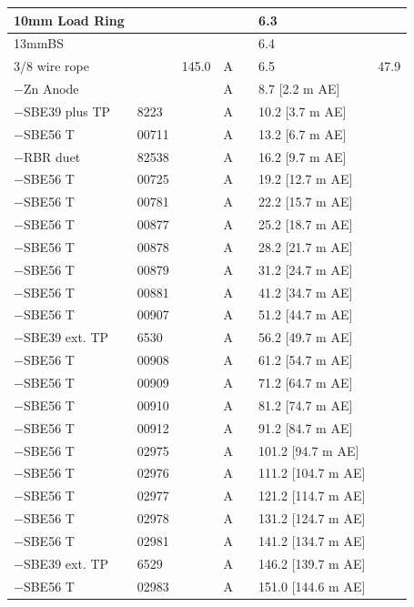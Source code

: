 \documentclass{article}
\begin{document}
\begin{tabularx}{\linewidth}{|X|X|l|l|l|X|l|}
10mm Load Ring &  &  &  &  & 6.3 &  \\ \hline
13mmBS &  &  &  &  & 6.4 &  \\ \hline
3/8 wire rope &  & 145.0 & A &  & 6.5 & 47.9 \\ \hline
$-$Zn Anode &  &  & A &  & 8.7 [2.2 m AE] &  \\ \hline
$-$SBE39 plus TP & 8223 &  & A &  & 10.2 [3.7 m AE] &  \\ \hline
$-$SBE56 T & 00711 &  & A &  & 13.2 [6.7 m AE] &  \\ \hline
$-$RBR duet & 82538 &  & A &  & 16.2 [9.7 m AE] &  \\ \hline
$-$SBE56 T & 00725 &  & A &  & 19.2 [12.7 m AE] &  \\ \hline
$-$SBE56 T & 00781 &  & A &  & 22.2 [15.7 m AE] &  \\ \hline
$-$SBE56 T & 00877 &  & A &  & 25.2 [18.7 m AE] &  \\ \hline
$-$SBE56 T & 00878 &  & A &  & 28.2 [21.7 m AE] &  \\ \hline
$-$SBE56 T & 00879 &  & A &  & 31.2 [24.7 m AE] &  \\ \hline
$-$SBE56 T & 00881 &  & A &  & 41.2 [34.7 m AE] &  \\ \hline
$-$SBE56 T & 00907 &  & A &  & 51.2 [44.7 m AE] &  \\ \hline
$-$SBE39 ext. TP & 6530 &  & A &  & 56.2 [49.7 m AE] &  \\ \hline
$-$SBE56 T & 00908 &  & A &  & 61.2 [54.7 m AE] &  \\ \hline
$-$SBE56 T & 00909 &  & A &  & 71.2 [64.7 m AE] &  \\ \hline
$-$SBE56 T & 00910 &  & A &  & 81.2 [74.7 m AE] &  \\ \hline
$-$SBE56 T & 00912 &  & A &  & 91.2 [84.7 m AE] &  \\ \hline
$-$SBE56 T & 02975 &  & A &  & 101.2 [94.7 m AE] &  \\ \hline
$-$SBE56 T & 02976 &  & A &  & 111.2 [104.7 m AE] &  \\ \hline
$-$SBE56 T & 02977 &  & A &  & 121.2 [114.7 m AE] &  \\ \hline
$-$SBE56 T & 02978 &  & A &  & 131.2 [124.7 m AE] &  \\ \hline
$-$SBE56 T & 02981 &  & A &  & 141.2 [134.7 m AE] &  \\ \hline
$-$SBE39 ext. TP & 6529 &  & A &  & 146.2 [139.7 m AE] &  \\ \hline
$-$SBE56 T & 02983 &  & A &  & 151.0 [144.6 m AE] &  \\ \hline

\end{tabularx}
\end{document}

